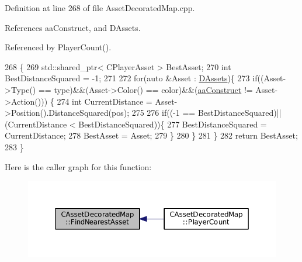 Definition at line 268 of file Asset\+Decorated\+Map.\+cpp.



References aa\+Construct, and D\+Assets.



Referenced by Player\+Count().


\begin{DoxyCode}
268                                                                                                            
                    \{
269     std::shared\_ptr< CPlayerAsset > BestAsset;
270     \textcolor{keywordtype}{int} BestDistanceSquared = -1;
271     
272     \textcolor{keywordflow}{for}(\textcolor{keyword}{auto} &Asset : \hyperlink{classCAssetDecoratedMap_a94eeed5b16141169b1ba6cb3842055aa}{DAssets})\{
273         \textcolor{keywordflow}{if}((Asset->Type() == type)&&(Asset->Color() == color)&&(\hyperlink{GameDataTypes_8h_ab47668e651a3032cfb9c40ea2d60d670a7ef6b863f66dd7dcc95a199cd758ae1d}{aaConstruct} != Asset->Action()))
      \{
274             \textcolor{keywordtype}{int} CurrentDistance = Asset->Position().DistanceSquared(pos);
275             
276             \textcolor{keywordflow}{if}((-1 == BestDistanceSquared)||(CurrentDistance < BestDistanceSquared))\{
277                 BestDistanceSquared = CurrentDistance;
278                 BestAsset = Asset;
279             \}
280         \}
281     \}
282     \textcolor{keywordflow}{return} BestAsset;
283 \}
\end{DoxyCode}
Here is the caller graph for this function\+:\nopagebreak
\begin{figure}[H]
\begin{center}
\leavevmode
\includegraphics[width=350pt]{classCAssetDecoratedMap_a37f9ffaf70ea515c422544a52dd80483_icgraph}
\end{center}
\end{figure}
\hypertarget{classCAssetDecoratedMap_a9e9eed95b427443d196b56b852cdeb9d}{}\label{classCAssetDecoratedMap_a9e9eed95b427443d196b56b852cdeb9d} 
